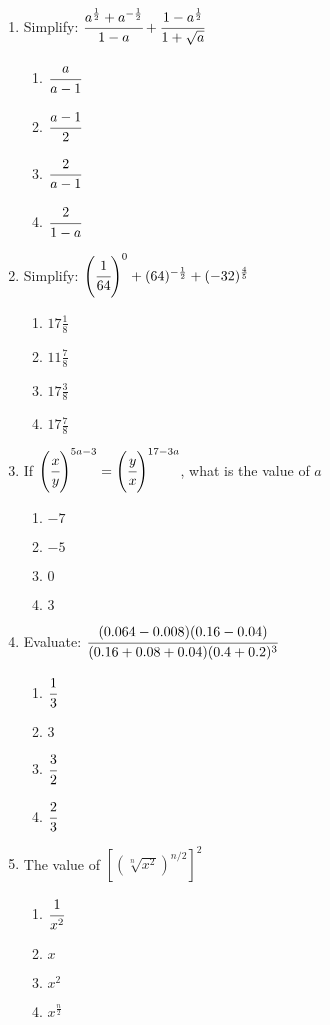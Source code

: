 \begin{multicols}{2}
\begin{enumerate}[label={\arabic*.}]
\begin{enumerate}[label={\Alph*.}]
	\end{enumerate}
\item Simplify: $\cfrac{a^\frac{1}{2} + a^{-\frac{1}{2}}}{1-a} + \cfrac{1- a^{\frac{1}{2}}}{1+ \sqrt{a}}$
	\begin{enumerate}[label={\Alph*.}]
	\item \(\cfrac{a}{a-1}\)
	\item \(\cfrac{a-1}{2}\)
	\item \(\cfrac{2}{a-1}\)
	\item \(\cfrac{2}{1-a}\)
	\end{enumerate}
\item Simplify: $\left(\cfrac{1}{64}\right)^0 + (64)^{-\frac{1}{2}} + (-32)^{\frac{4}{5}}$
	\begin{enumerate}[label={\Alph*.}]
	\item \(17\frac{1}{8}\)
	\item \(11\frac{7}{8}\)
	\item \(17\frac{3}{8}\)
	\item \(17\frac{7}{8}\)
	\end{enumerate}
\item If $\left(\cfrac{x}{y}\right)^{5a-3} = \left(\cfrac{y}{x}\right)^{17-3a}$, what is the value of $a$
	\begin{enumerate}[label={\Alph*.}]
	\item \(-7\)
	\item \(-5\)
	\item \(0\)
	\item \(3\)
	\end{enumerate}
\item Evaluate: $\cfrac{(0.064 - 0.008)(0.16 -0.04)}{(0.16+0.08+0.04)(0.4+0.2)^3}$
	\begin{enumerate}[label={\Alph*.}]
	\item \(\cfrac{1}{3}\)
	\item \(3\)
	\item \(\cfrac{3}{2}\)
	\item \(\cfrac{2}{3}\)
	\end{enumerate}
\item The value of $\left[\left(\sqrt[n]{x^2}\right)^{n/2}\right]^2$
	\begin{enumerate}[label={\Alph*.}]
	\item \(\cfrac{1}{x^2}\)
	\item \(x\)
	\item \(x^2\)
	\item \(x^{\frac{n}{2}}\)
	\end{enumerate}

\end{enumerate}
\end{multicols}
